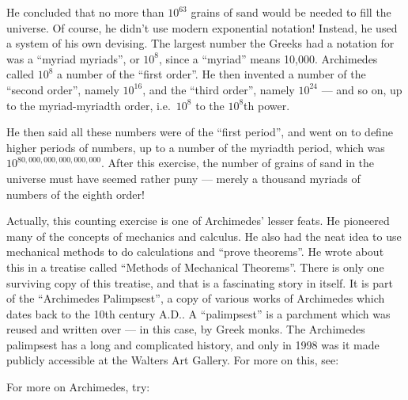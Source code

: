 \documentclass{article}
\def\tightlist{}
\renewcommand{\texttt}[1]{%
  \begingroup
  \ttfamily
  \begingroup\lccode`~=`/\lowercase{\endgroup\def~}{/\discretionary{}{}{}}%
  \begingroup\lccode`~=`[\lowercase{\endgroup\def~}{[\discretionary{}{}{}}%
  \begingroup\lccode`~=`.\lowercase{\endgroup\def~}{.\discretionary{}{}{}}%
  \catcode`/=\active\catcode`[=\active\catcode`.=\active
  \scantokens{#1\noexpand}%
  \endgroup
}
\begin{document}
He concluded that no more than \(10^{63}\) grains of sand would be
needed to fill the universe. Of course, he didn't use modern exponential
notation! Instead, he used a system of his own devising. The largest
number the Greeks had a notation for was a ``myriad myriads'', or
\(10^8\), since a ``myriad'' means 10,000. Archimedes called \(10^8\) a
number of the ``first order''. He then invented a number of the ``second
order'', namely \(10^{16}\), and the ``third order'', namely \(10^{24}\)
--- and so on, up to the myriad-myriadth order, i.e.~\(10^8\) to the
\(10^8\)th power.

He then said all these numbers were of the ``first period'', and went on
to define higher periods of numbers, up to a number of the myriadth
period, which was \(10^{80,000,000,000,000,000}\). After this exercise,
the number of grains of sand in the universe must have seemed rather
puny --- merely a thousand myriads of numbers of the eighth order!

Actually, this counting exercise is one of Archimedes' lesser feats. He
pioneered many of the concepts of mechanics and calculus. He also had
the neat idea to use mechanical methods to do calculations and ``prove
theorems''. He wrote about this in a treatise called ``Methods of
Mechanical Theorems''. There is only one surviving copy of this
treatise, and that is a fascinating story in itself. It is part of the
``Archimedes Palimpsest'', a copy of various works of Archimedes which
dates back to the 10th century A.D.. A ``palimpsest'' is a parchment
which was reused and written over --- in this case, by Greek monks. The
Archimedes palimpsest has a long and complicated history, and only in
1998 was it made publicly accessible at the Walters Art Gallery. For
more on this, see:


For more on Archimedes, try:

\end{document}
